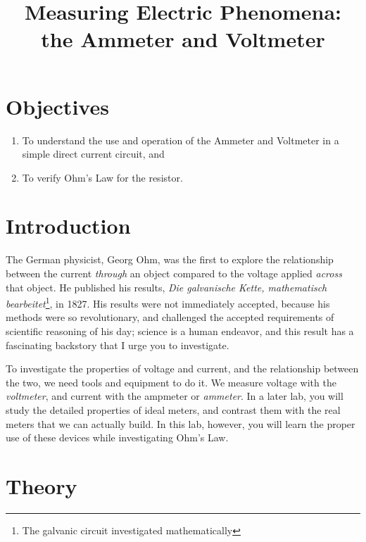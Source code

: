 \documentclass[12pt]{article}
\title{Measuring Electric Phenomena:\\the Ammeter and Voltmeter}
\author{}
\date{}
\begin{document}
\maketitle

\section{Objectives}
\label{sec:objectives}

\begin{enumerate}
\item To understand the use and operation of the Ammeter and
  Voltmeter in a simple direct current circuit, and
\item To verify Ohm's Law for the resistor.
\end{enumerate}

\section{Introduction}
\label{sec:introduction}

The German physicist, Georg Ohm, was the first to explore the
relationship between the current \textit{through} an object compared
to the voltage applied \textit{across} that object.  He published his
results, \textit{Die galvanische Kette, mathematisch
  bearbeitet}\footnote{The galvanic circuit investigated
  mathematically}, in 1827.  His results were not immediately
accepted, because his methods were so revolutionary, and challenged
the accepted requirements of scientific reasoning of his day; science
is a human endeavor, and this result has a fascinating backstory that
I urge you to investigate.

To investigate the properties of voltage and current, and the
relationship between the two, we need tools and equipment to do it.
We measure voltage with the \textit{voltmeter}, and current with the
ampmeter or \textit{ammeter}.  In a later lab, you will study the
detailed properties of ideal meters, and contrast them with the real
meters that we can actually build.  In this lab, however, you will
learn the proper use of these devices while investigating Ohm's Law.

\section{Theory}
\label{sec:theory}
\end{document}

